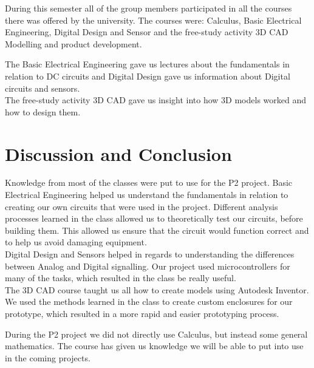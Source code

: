 During this semester all of the group members participated in all the courses there was offered by the university. The courses were: Calculus, Basic Electrical Engineering, Digital Design and Sensor and the free-study activity 3D CAD Modelling and product development.

The Basic Electrical Engineering gave us lectures about the fundamentals in relation to DC circuits and Digital Design gave us information about Digital circuits and sensors.\\
The free-study activity 3D CAD gave us insight into how 3D models worked and how to design them.

\section{Discussion and Conclusion}

Knowledge from most of the classes were put to use for the P2 project. Basic Electrical Engineering helped us understand the fundamentals in relation to creating our own circuits that were used in the project. Different analysis processes learned in the class allowed us to theoretically test our circuits, before building them.  This allowed us ensure that the circuit would function correct and to help us avoid damaging equipment.\\
Digital Design and Sensors helped in regards to understanding the differences between Analog and Digital signalling. Our project used microcontrollers for many of the tasks, which resulted in the class be really useful.\\ %
The 3D CAD course taught us all how to create models using Autodesk Inventor. We used the methods learned in the class to create custom enclosures for our prototype, which resulted in a more rapid and easier prototyping process. 

During the P2 project we did not directly use Calculus, but instead some general mathematics. The course has given us knowledge we will be able to put into use in the coming projects.